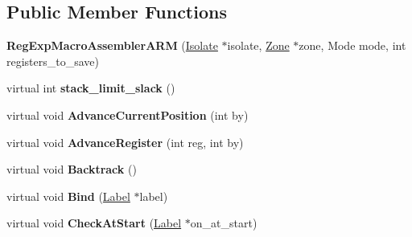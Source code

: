 \subsection*{Public Member Functions}
\begin{DoxyCompactItemize}
\item 
{\bfseries Reg\+Exp\+Macro\+Assembler\+A\+RM} (\hyperlink{classv8_1_1internal_1_1_isolate}{Isolate} $\ast$isolate, \hyperlink{classv8_1_1internal_1_1_zone}{Zone} $\ast$zone, Mode mode, int registers\+\_\+to\+\_\+save)\hypertarget{classv8_1_1internal_1_1_reg_exp_macro_assembler_a_r_m_accaa5048c0eda76cf8290c33f85895fd}{}\label{classv8_1_1internal_1_1_reg_exp_macro_assembler_a_r_m_accaa5048c0eda76cf8290c33f85895fd}

\item 
virtual int {\bfseries stack\+\_\+limit\+\_\+slack} ()\hypertarget{classv8_1_1internal_1_1_reg_exp_macro_assembler_a_r_m_aa176dad9a2d8a917e8943e805c70810b}{}\label{classv8_1_1internal_1_1_reg_exp_macro_assembler_a_r_m_aa176dad9a2d8a917e8943e805c70810b}

\item 
virtual void {\bfseries Advance\+Current\+Position} (int by)\hypertarget{classv8_1_1internal_1_1_reg_exp_macro_assembler_a_r_m_a447917748bc4e9f3e24b777fef7fca4d}{}\label{classv8_1_1internal_1_1_reg_exp_macro_assembler_a_r_m_a447917748bc4e9f3e24b777fef7fca4d}

\item 
virtual void {\bfseries Advance\+Register} (int reg, int by)\hypertarget{classv8_1_1internal_1_1_reg_exp_macro_assembler_a_r_m_a9882542f3821fd6a01585ffd762a6900}{}\label{classv8_1_1internal_1_1_reg_exp_macro_assembler_a_r_m_a9882542f3821fd6a01585ffd762a6900}

\item 
virtual void {\bfseries Backtrack} ()\hypertarget{classv8_1_1internal_1_1_reg_exp_macro_assembler_a_r_m_a0ee34958d5b9f8d2be33d5d80df3e1bb}{}\label{classv8_1_1internal_1_1_reg_exp_macro_assembler_a_r_m_a0ee34958d5b9f8d2be33d5d80df3e1bb}

\item 
virtual void {\bfseries Bind} (\hyperlink{classv8_1_1internal_1_1_label}{Label} $\ast$label)\hypertarget{classv8_1_1internal_1_1_reg_exp_macro_assembler_a_r_m_a2f418676c0b9a75832b84485ad46d7b8}{}\label{classv8_1_1internal_1_1_reg_exp_macro_assembler_a_r_m_a2f418676c0b9a75832b84485ad46d7b8}

\item 
virtual void {\bfseries Check\+At\+Start} (\hyperlink{classv8_1_1internal_1_1_label}{Label} $\ast$on\+\_\+at\+\_\+start)\hypertarget{classv8_1_1internal_1_1_reg_exp_macro_assembler_a_r_m_a5f1725422af4f257c79571edda201fd7}{}\label{classv8_1_1internal_1_1_reg_exp_macro_assembler_a_r_m_a5f1725422af4f257c79571edda201fd7}


\end{DoxyCompactItemize}
